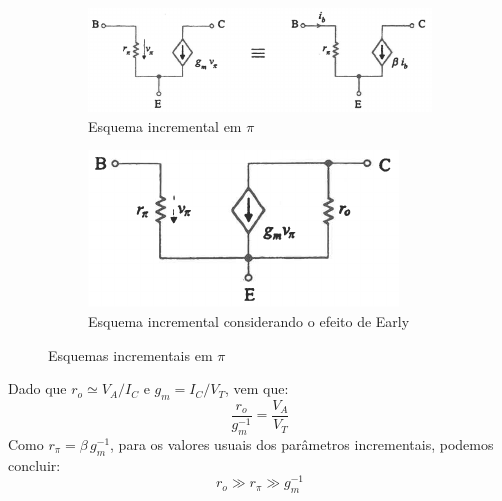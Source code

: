 \begin{figure}[H]
    \begin{subfigure}[b]{0.5\linewidth}
        \centering
        \includegraphics[width = \linewidth]{img/3/BJT/esquema-incremental.png}
        \caption{Esquema incremental em $\pi$ \cite{medeiros:CTBM}}
        \label{fig:esquema-incremental}
    \end{subfigure}%
    \begin{subfigure}[b]{0.5\linewidth}
        \centering
        \includegraphics[width = 0.55\linewidth]{img/3/BJT/esquema-incremental-Early.png}
        \caption{Esquema incremental considerando o efeito de Early \cite{medeiros:CTBM}}
        \label{fig:esquema-incremental-Early}
    \end{subfigure}
    \caption{Esquemas incrementais em $\pi$}
    \label{fig:esquemas-incrementais}
\end{figure}

\vspace{-0.5em}
\noindent Dado que $r_o \simeq V_A/I_C$ e $g_m = I_C/V_T$,  vem que: 
$$
    \frac{r_o}{g_m^{-1}} = \frac{V_A}{V_T}
$$
\noindent Como $r_\pi = \beta\, g_m^{-1}$, para os valores usuais dos parâmetros incrementais, podemos concluir:
$$
    \boxed{r_o \gg r_\pi \gg g_m^{-1}}
$$

